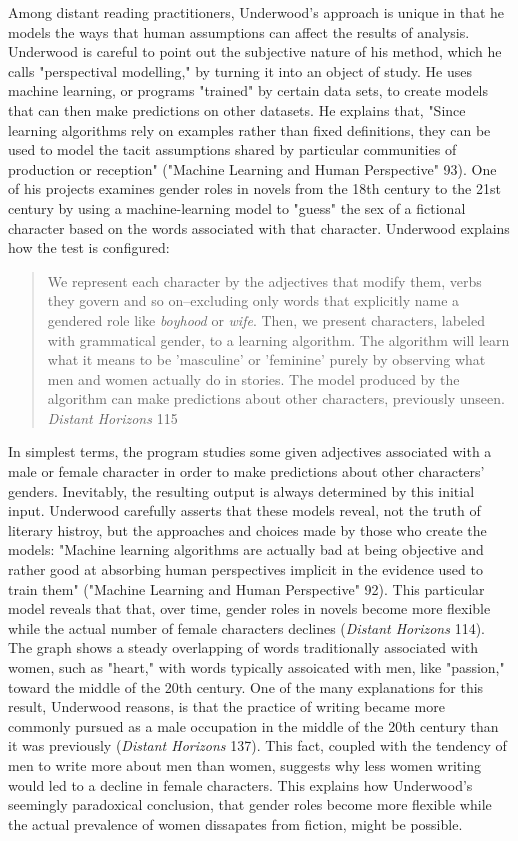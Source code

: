 \documentclass[11pt]{article}
\begin{document}
Among distant reading practitioners, Underwood's approach is unique in
that he models the ways that human assumptions can affect the results
of analysis. Underwood is careful to point out the subjective nature
of his method, which he calls "perspectival modelling," by turning it
into an object of study. He uses machine learning, or programs
"trained" by certain data sets, to create models that can then make
predictions on other datasets. He explains that, "Since learning
algorithms rely on examples rather than fixed definitions, they can be
used to model the tacit assumptions shared by particular communities
of production or reception" ("Machine Learning and Human Perspective"
93). One of his projects examines gender roles in novels from the
18th century to the 21st century by using a machine-learning model to
"guess" the sex of a fictional character based on the words associated
with that character. Underwood explains how the test is configured:
\begin{quote}
We represent each character by the adjectives that modify them, verbs
they govern and so on--excluding only words that explicitly name a
gendered role like \emph{boyhood} or \emph{wife}. Then, we present characters,
labeled with grammatical gender, to a learning algorithm. The
algorithm will learn what it means to be 'masculine' or 'feminine'
purely by observing what men and women actually do in stories. The
model produced by the algorithm can make predictions about other
characters, previously unseen. \emph{Distant Horizons} 115
\end{quote}
In simplest terms, the program studies some given adjectives
associated with a male or female character in order to make
predictions about other characters' genders. Inevitably, the resulting
output is always determined by this initial input. Underwood carefully
asserts that these models reveal, not the truth of literary histroy,
but the approaches and choices made by those who create the models:
"Machine learning algorithms are actually bad at being objective and
rather good at absorbing human perspectives implicit in the evidence
used to train them" ("Machine Learning and Human Perspective"
92). This particular model reveals that that, over time, gender roles
in novels become more flexible while the actual number of female
characters declines (\emph{Distant Horizons} 114). The graph shows a steady
overlapping of words traditionally associated with women, such as
"heart," with words typically assoicated with men, like "passion,"
toward the middle of the 20th century. One of the many explanations
for this result, Underwood reasons, is that the practice of writing
became more commonly pursued as a male occupation in the middle of the
20th century than it was previously (\emph{Distant Horizons} 137). This
fact, coupled with the tendency of men to write more about men than
women, suggests why less women writing would led to a decline in
female characters. This explains how Underwood's seemingly paradoxical
conclusion, that gender roles become more flexible while the actual
prevalence of women dissapates from fiction, might be possible.
\end{document}
